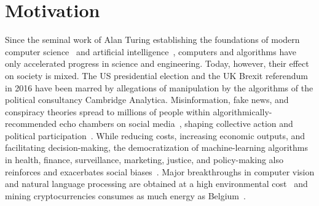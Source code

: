 \section{Motivation}
\label{in:sec:motivation}

Since the seminal work of Alan Turing establishing the foundations of modern computer science~\citep{turing1937computable} and artificial intelligence~\citep{turing2009computing}, computers and algorithms have only accelerated progress in science and engineering.
Today, however, their effect on society is mixed.
The US presidential election and the UK Brexit referendum in 2016 have been marred by allegations of manipulation by the algorithms of the political consultancy Cambridge Analytica.
Misinformation, fake news, and conspiracy theories spread to millions of people within algorithmically-recommended echo chambers on social media~\citep{kumar2016disinformation,garimella2018political,ribeiro2020auditing,cinelli2021echo}, shaping collective action and political participation~\citep{margetts2015political}.
While reducing costs, increasing economic outputs, and facilitating decision-making, the democratization of machine-learning algorithms in health, finance, surveillance, marketing, justice, and policy-making also reinforces and exacerbates social biases~\citep{hajian2016algorithmic,stoica2018algorithmic,rodolfa2020case}.
Major breakthroughs in computer vision and natural language processing are obtained at a high environmental cost~\citep{strubell2019energy} and mining cryptocurrencies consumes as much energy as Belgium~\citep{gallersdorfer2020energy,de2020bitcoin}.

